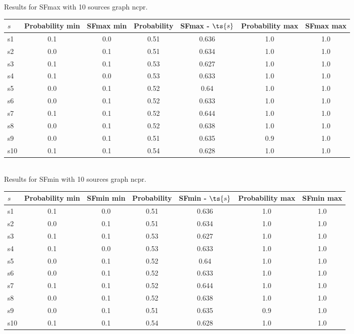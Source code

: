 \documentclass{article}
\begin{document}
\noindent Results for SFmax with 10 sources graph ncpr.

\noindent\begin{tabular}{|l|c|c|c|c|c|c|}
\hline
$s$& Probability min & SFmax min & Probability & SFmax - $\ts{s}$ & Probability max & SFmax max\\
\hline
s1 &0.1 & 0.0 & 0.51 & 0.636 & 1.0 & 1.0\\
\hline
s2 &0.0 & 0.1 & 0.51 & 0.634 & 1.0 & 1.0\\
\hline
s3 &0.1 & 0.1 & 0.53 & 0.627 & 1.0 & 1.0\\
\hline
s4 &0.1 & 0.0 & 0.53 & 0.633 & 1.0 & 1.0\\
\hline
s5 &0.0 & 0.1 & 0.52 & 0.64 & 1.0 & 1.0\\
\hline
s6 &0.0 & 0.1 & 0.52 & 0.633 & 1.0 & 1.0\\
\hline
s7 &0.1 & 0.1 & 0.52 & 0.644 & 1.0 & 1.0\\
\hline
s8 &0.0 & 0.1 & 0.52 & 0.638 & 1.0 & 1.0\\
\hline
s9 &0.0 & 0.1 & 0.51 & 0.635 & 0.9 & 1.0\\
\hline
s10 &0.1 & 0.1 & 0.54 & 0.628 & 1.0 & 1.0\\
\hline
\end{tabular}\\

\noindent Results for SFmin with 10 sources graph ncpr.

\noindent\begin{tabular}{|l|c|c|c|c|c|c|}
\hline
$s$& Probability min & SFmin min & Probability & SFmin - $\ts{s}$ & Probability max & SFmin max\\
\hline
s1 &0.1 & 0.0 & 0.51 & 0.636 & 1.0 & 1.0\\
\hline
s2 &0.0 & 0.1 & 0.51 & 0.634 & 1.0 & 1.0\\
\hline
s3 &0.1 & 0.1 & 0.53 & 0.627 & 1.0 & 1.0\\
\hline
s4 &0.1 & 0.0 & 0.53 & 0.633 & 1.0 & 1.0\\
\hline
s5 &0.0 & 0.1 & 0.52 & 0.64 & 1.0 & 1.0\\
\hline
s6 &0.0 & 0.1 & 0.52 & 0.633 & 1.0 & 1.0\\
\hline
s7 &0.1 & 0.1 & 0.52 & 0.644 & 1.0 & 1.0\\
\hline
s8 &0.0 & 0.1 & 0.52 & 0.638 & 1.0 & 1.0\\
\hline
s9 &0.0 & 0.1 & 0.51 & 0.635 & 0.9 & 1.0\\
\hline
s10 &0.1 & 0.1 & 0.54 & 0.628 & 1.0 & 1.0\\
\hline
\end{tabular}\\
\end{document}
